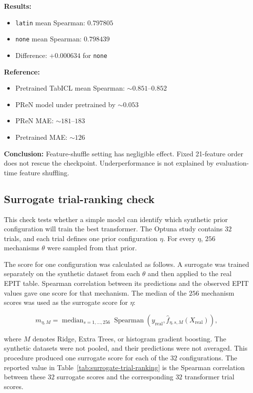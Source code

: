 \documentclass{article}
\begin{document}
\textbf{Results:}
\begin{itemize}
    \item \texttt{latin} mean Spearman: $0.797805$
    \item \texttt{none} mean Spearman: $0.798439$
    \item Difference: $+0.000634$ for \texttt{none}
\end{itemize}

\textbf{Reference:}
\begin{itemize}
    \item Pretrained TabICL mean Spearman: $\sim 0.851$--$0.852$
    \item PReN model under pretrained by $\sim 0.053$
    \item PReN MAE: $\sim 181$--$183$
    \item Pretrained MAE: $\sim 126$
\end{itemize}

\textbf{Conclusion:}
Feature-shuffle setting has negligible effect. Fixed 21-feature order does not rescue the checkpoint. Underperformance is not explained by evaluation-time feature shuffling.


\subsection{Surrogate trial-ranking check}
\label{sec:surrogate-trial-ranking-check}

This check tests whether a simple model can identify which synthetic prior
configuration will train the best transformer. The Optuna study contains $32$
trials, and each trial defines one prior configuration $\eta$. For every $\eta$,
$256$ mechanisms $\theta$ were sampled from that prior.

The score for one configuration was calculated as follows. A surrogate was
trained separately on the synthetic dataset from each $\theta$ and then applied
to the real EPIT table. Spearman correlation between its predictions and the
observed EPIT values gave one score for that mechanism. The median of the $256$
mechanism scores was used as the surrogate score for $\eta$:

\begin{equation}
m_{\eta,M}
=
\operatorname{median}_{s=1,\ldots,256}
\operatorname{Spearman}
\left(
y_{\mathrm{real}},
\widehat f_{\eta,s,M}(X_{\mathrm{real}})
\right),
\end{equation}

where $M$ denotes Ridge, Extra Trees, or histogram gradient boosting. The
synthetic datasets were not pooled, and their predictions were not averaged.
This procedure produced one surrogate score for each of the $32$ configurations.
The reported value in Table~\ref{tab:surrogate-trial-ranking} is the Spearman
correlation between these $32$ surrogate scores and the corresponding $32$
transformer trial scores.
\end{document}
